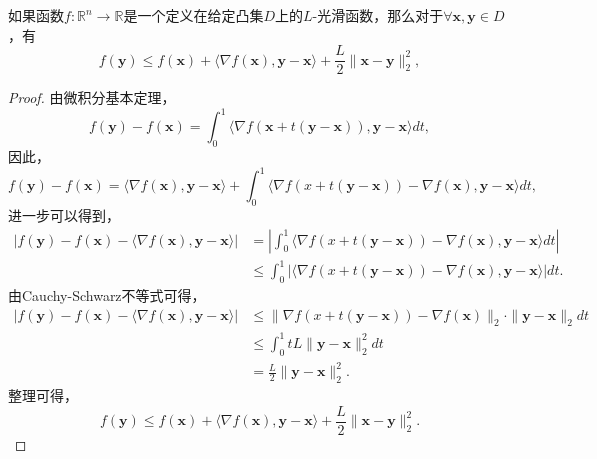 \begin{theorem}[下降引理]\cite{2017FirstOrder}
    如果函数$f: \mathbb{R}^{n}\rightarrow \mathbb{R}$是一个定义在给定凸集$D$上的$L$-光滑函数，那么对于$\forall \bm{x}, \bm{y}\in D$，有
    \begin{equation}
        f(\bm{y}) \leq f(\bm{x}) + \langle \nabla f(\bm{x}), \bm{y}-\bm{x} \rangle + \frac{L}{2}\|\bm{x}-\bm{y}\|_{2}^{2} ,
    \end{equation}
    \label{thm435}
\end{theorem}

\begin{proof}
    由微积分基本定理，
    \begin{equation*}
        f(\bm{y}) - f(\bm{x}) = \int_{0}^{1}\langle \nabla f(\bm{x} + t(\bm{y} - \bm{x})), \bm{y}-\bm{x}\rangle dt ,
    \end{equation*}
因此，
    \begin{equation*}
        f(\bm{y}) - f(\bm{x}) = \langle \nabla f(\bm{x}), \bm{y}-\bm{x}\rangle + \int_{0}^{1}\langle \nabla f(x+t(\bm{y}-\bm{x})) - \nabla f(\bm{x}), \bm{y}-\bm{x}\rangle dt ,
    \end{equation*}
进一步可以得到，
    \begin{equation*}
        \begin{split}
            |f(\bm{y}) - f(\bm{x}) - \langle \nabla f(\bm{x}), \bm{y}-\bm{x}\rangle| &= |\int_{0}^{1}\langle \nabla f(x+t(\bm{y}-\bm{x})) - \nabla f(\bm{x}), \bm{y}-\bm{x}\rangle dt| \\
            &\leq \int_{0}^{1} |\langle \nabla f(x+t(\bm{y}-\bm{x})) - \nabla f(\bm{x}), \bm{y}-\bm{x}\rangle| dt .
        \end{split}
    \end{equation*}
由Cauchy-Schwarz不等式可得，
    \begin{equation*}
        \begin{split}
            |f(\bm{y}) - f(\bm{x}) - \langle \nabla f(\bm{x}), \bm{y}-\bm{x}\rangle| &\leq \|\nabla f(x+t(\bm{y}-\bm{x})) - \nabla f(\bm{x})\|_{2} \cdot \|\bm{y}-\bm{x}\|_{2} dt \\
            &\leq \int_{0}^{1} tL\|\bm{y}-\bm{x}\|_{2}^{2}dt \\
            &= \frac{L}{2} \|\bm{y}-\bm{x}\|_{2}^{2} .
        \end{split}
    \end{equation*}
整理可得，
    \begin{equation*}
        f(\bm{y}) \leq f(\bm{x}) + \langle \nabla f(\bm{x}), \bm{y}-\bm{x} \rangle + \frac{L}{2}\|\bm{x}-\bm{y}\|_{2}^{2} .
    \end{equation*}
\end{proof}

